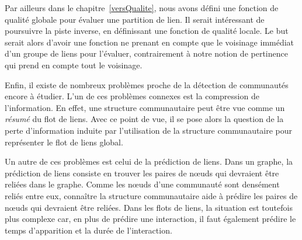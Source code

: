 Par ailleurs dans le chapitre~\ref{versQualite}, nous avons défini une fonction de qualité globale pour évaluer une partition de lien.
Il serait intéressant de poursuivre la piste inverse, en définissant une fonction de qualité locale.
Le but serait alors d'avoir une fonction ne prenant en compte que le voisinage immédiat d'un groupe de liens pour l'évaluer, contrairement à notre notion de pertinence qui prend en compte tout le voisinage.

Enfin, il existe de nombreux problèmes proche de la détection de communautés encore à étudier.
L'un de ces problèmes connexes est la compression de l'information.
En effet, une structure communautaire peut être vue comme un \emph{résumé} du flot de liens.
Avec ce point de vue, il se pose alors la question de la perte d'information induite par l'utilisation de la structure communautaire pour représenter le flot de liens global.

Un autre de ces problèmes est celui de la prédiction de liens.
Dans un graphe, la prédiction de liens consiste en trouver les paires de n\oe{}uds qui devraient être reliées dans le graphe.
Comme les n\oe{}uds d'une communauté sont densément reliés entre eux, connaître la structure communautaire aide à prédire les paires de n\oe{}uds qui devraient être reliées.
Dans les flots de liens, la situation est toutefois plus complexe car, en plus de prédire une interaction, il faut également prédire le temps d'apparition et la durée de l'interaction.



\bigskip

